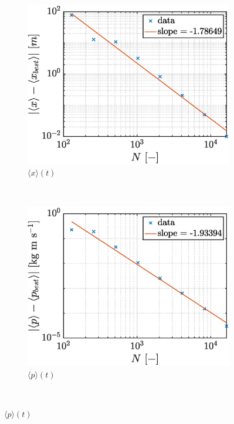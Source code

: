 \documentclass[a4paper,12pt,twoside]{article}
\begin{document}
    \begin{figure}[h]
      \centering
      \begin{subfigure}{0.45\textwidth}
        \includegraphics[width=\textwidth]{graphs/i_conv_x.eps}
        \caption{$\langle x \rangle (t)$}
        \label{fig:i_conv_x}
      \end{subfigure}
      ~
      \begin{subfigure}{0.45\textwidth}
        \includegraphics[width=\textwidth]{graphs/i_conv_p.eps}
        \caption{$\langle p \rangle (t)$}
        \label{fig:i_conv_p}
      \end{subfigure}
      ~

\end{figure}
\end{document}
